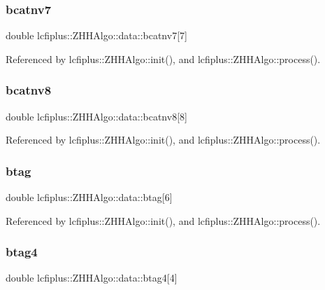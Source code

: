 \subsubsection{bcatnv7}
{\footnotesize\ttfamily double lcfiplus\+::\+Z\+H\+H\+Algo\+::data\+::bcatnv7[7]}



Referenced by lcfiplus\+::\+Z\+H\+H\+Algo\+::init(), and lcfiplus\+::\+Z\+H\+H\+Algo\+::process().

\mbox{\label{structlcfiplus_1_1ZHHAlgo_1_1data_a378f55d438b866d63392f8ed6a414b20}} 
\subsubsection{bcatnv8}
{\footnotesize\ttfamily double lcfiplus\+::\+Z\+H\+H\+Algo\+::data\+::bcatnv8[8]}



Referenced by lcfiplus\+::\+Z\+H\+H\+Algo\+::init(), and lcfiplus\+::\+Z\+H\+H\+Algo\+::process().

\mbox{\label{structlcfiplus_1_1ZHHAlgo_1_1data_a234a298f31e544683774b617a19f5b86}} 
\subsubsection{btag}
{\footnotesize\ttfamily double lcfiplus\+::\+Z\+H\+H\+Algo\+::data\+::btag[6]}



Referenced by lcfiplus\+::\+Z\+H\+H\+Algo\+::init(), and lcfiplus\+::\+Z\+H\+H\+Algo\+::process().

\mbox{\label{structlcfiplus_1_1ZHHAlgo_1_1data_af433d72e2a91e96939054e96259644a2}} 
\subsubsection{btag4}
{\footnotesize\ttfamily double lcfiplus\+::\+Z\+H\+H\+Algo\+::data\+::btag4[4]}



